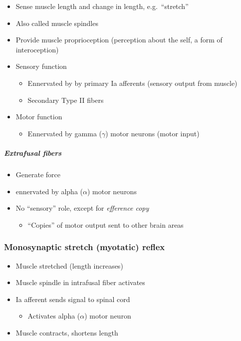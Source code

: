 \documentclass[
  letterpaper,
  DIV=11,
  numbers=noendperiod]{scrartcl}
\let\oldsubparagraph\subparagraph
\renewcommand{\subparagraph}[1]{\oldsubparagraph{#1}\mbox{}}
\providecommand{\tightlist}{%
  \setlength{\itemsep}{0pt}\setlength{\parskip}{0pt}}\usepackage{longtable,booktabs,array}
\begin{document}
\begin{itemize}
\tightlist
\item
  Sense muscle length and change in length, e.g.~``stretch''
\item
  Also called muscle spindles
\item
  Provide muscle proprioception (perception about the self, a form of
  interoception)
\item
  Sensory function

  \begin{itemize}
  \tightlist
  \item
    Ennervated by by primary Ia afferents (sensory output from muscle)
  \item
    Secondary Type II fibers
  \end{itemize}
\item
  Motor function

  \begin{itemize}
  \tightlist
  \item
    Ennervated by gamma (\(\gamma\)) motor neurons (motor input)
  \end{itemize}
\end{itemize}

\subparagraph{Extrafusal fibers}\label{extrafusal-fibers}

\begin{itemize}
\tightlist
\item
  Generate force
\item
  ennervated by alpha (\(\alpha\)) motor neurons
\item
  No ``sensory'' role, except for \emph{efference copy}

  \begin{itemize}
  \tightlist
  \item
    ``Copies'' of motor output sent to other brain areas
  \end{itemize}
\end{itemize}

\subsubsection{Monosynaptic stretch (myotatic)
reflex}\label{monosynaptic-stretch-myotatic-reflex}

\begin{itemize}
\tightlist
\item
  Muscle stretched (length increases)
\item
  Muscle spindle in intrafusal fiber activates
\item
  Ia afferent sends signal to spinal cord

  \begin{itemize}
  \tightlist
  \item
    Activates alpha (\(\alpha\)) motor neuron
  \end{itemize}
\item
  Muscle contracts, shortens length
\end{itemize}
\end{document}
